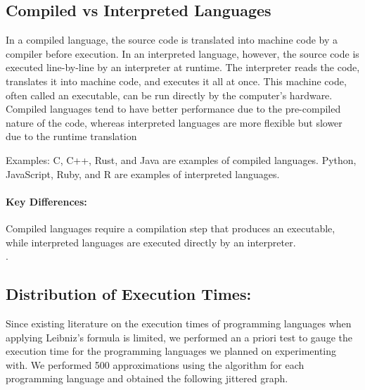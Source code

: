 \documentclass[12pt,halfline,a4paper,]{ouparticle}
\begin{document}
\hypertarget{compiled-vs-interpreted-languages}{%
\subsection{Compiled vs Interpreted
Languages}\label{compiled-vs-interpreted-languages}}

In a compiled language, the source code is translated into machine code
by a compiler before execution. In an interpreted language, however, the
source code is executed line-by-line by an interpreter at runtime. The
interpreter reads the code, translates it into machine code, and
executes it all at once. This machine code, often called an executable,
can be run directly by the computer's hardware. Compiled languages tend
to have better performance due to the pre-compiled nature of the code,
whereas interpreted languages are more flexible but slower due to the
runtime translation

Examples: C, C++, Rust, and Java are examples of compiled languages.
Python, JavaScript, Ruby, and R are examples of interpreted languages.

\hypertarget{key-differences}{%
\paragraph{Key Differences:}\label{key-differences}}

Compiled languages require a compilation step that produces an
executable, while interpreted languages are executed directly by an
interpreter.\\
.

\hypertarget{distribution-of-execution-times}{%
\subsection{Distribution of Execution
Times:}\label{distribution-of-execution-times}}

Since existing literature on the execution times of programming
languages when applying Leibniz's formula is limited, we performed an a
priori test to gauge the execution time for the programming languages we
planned on experimenting with. We performed 500 approximations using the
algorithm for each programming language and obtained the following
jittered graph.
\end{document}
